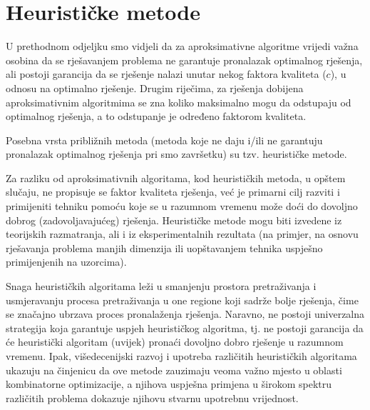 \documentclass[a4paper, utf8, 11pt, colorlinks]{book}
\theoremstyle{definition}
\begin{document}

  
\section{Heurističke metode}
 U prethodnom odjeljku smo vidjeli da za aproksimativne algoritme vrijedi važna osobina da se rješavanjem problema ne garantuje pronalazak optimalnog rješenja, ali postoji garancija da se rješenje nalazi unutar nekog faktora kvaliteta ($c$), u odnosu na optimalno rješenje.  
 Drugim riječima, za rješenja dobijena aproksimativnim algoritmima se zna koliko maksimalno mogu da odstupaju od optimalnog rješenja, a to odstupanje je određeno faktorom kvaliteta.
 
 Posebna vrsta približnih metoda (metoda koje ne daju i/ili ne garantuju pronalazak optimalnog rješenja pri smo završetku) su tzv. heurističke metode. 
 
 Za razliku od aproksimativnih algoritama, kod heurističkih metoda, u opštem slučaju, ne propisuje se faktor kvaliteta rješenja, već je primarni cilj razviti i primijeniti tehniku pomoću koje se u razumnom vremenu može doći do dovoljno dobrog (zadovoljavajućeg) rješenja. Heurističke metode mogu biti izvedene iz teorijskih razmatranja, ali i iz eksperimentalnih rezultata (na primjer, na osnovu rješavanja problema manjih dimenzija ili uopštavanjem tehnika uspješno primijenjenih na uzorcima). 
 
 
 Snaga heurističkih algoritama leži u smanjenju prostora pretraživanja i usmjeravanju procesa pretraživanja u one regione koji sadrže bolje rješenja, čime se značajno ubrzava proces pronalaženja rješenja. Naravno, ne postoji univerzalna strategija koja garantuje uspjeh heurističkog algoritma, tj. ne postoji garancija da će heuristički algoritam (uvijek) pronaći dovoljno dobro rješenje u razumnom vremenu. Ipak, višedecenijski razvoj i upotreba različitih heurističkih algoritama ukazuju na činjenicu da ove metode zauzimaju veoma važno mjesto u oblasti kombinatorne optimizacije, a njihova uspješna primjena u širokom spektru različitih problema dokazuje njihovu stvarnu upotrebnu vrijednost.
 
\end{document}
